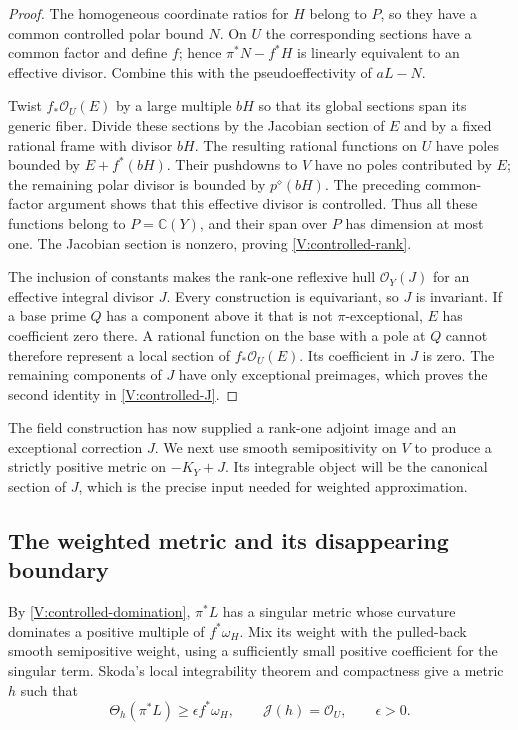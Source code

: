 \begin{proof}
The homogeneous coordinate ratios for $H$ belong to $P$, so they have
a common controlled polar bound $N$.  On $U$ the corresponding sections
have a common factor and define $f$; hence
$\pi^*N-f^*H$ is linearly equivalent to an effective divisor.
Combine this with the pseudoeffectivity of $aL-N$.

Twist $f_*\mathcal O_U(E)$ by a large multiple $bH$ so that its global
sections span its generic fiber.  Divide these sections by the Jacobian
section of $E$ and by a fixed rational frame with divisor $bH$.
The resulting rational functions on $U$ have poles bounded by
$E+f^*(bH)$.  Their pushdowns to $V$ have no poles contributed by $E$;
the remaining polar divisor is bounded by $p^\diamond(bH)$.
The preceding common-factor argument shows that this effective divisor
is controlled.  Thus all these functions belong to $P=\mathbb C(Y)$,
and their span over $P$ has dimension at most one.  The Jacobian section
is nonzero, proving \eqref{V:controlled-rank}.

The inclusion of constants makes the rank-one reflexive hull
$\mathcal O_Y(J)$ for an effective integral divisor $J$.  Every
construction is equivariant, so $J$ is invariant.  If a base prime $Q$
has a component above it that is not $\pi$-exceptional, $E$ has
coefficient zero there.  A rational function on the base with a pole at
$Q$ cannot therefore represent a local section of
$f_*\mathcal O_U(E)$.  Its coefficient in $J$ is zero.  The remaining
components of $J$ have only exceptional preimages, which proves the
second identity in \eqref{V:controlled-J}.
\end{proof}

The field construction has now supplied a rank-one adjoint image and
an exceptional correction $J$.  We next use smooth semipositivity on
$V$ to produce a strictly positive metric on $-K_Y+J$.  Its integrable
object will be the canonical section of $J$, which is the precise input
needed for weighted approximation.

\subsection{The weighted metric and its disappearing boundary}

By \eqref{V:controlled-domination}, $\pi^*L$ has a singular metric
whose curvature dominates a positive multiple of $f^*\omega_H$.
Mix its weight with the pulled-back smooth semipositive weight, using a
sufficiently small positive coefficient for the singular term.
Skoda's local integrability theorem \cite{Skoda1972} and compactness
give a metric $h$
such that
\begin{equation}\label{V:controlled-upstairs-metric}
 \Theta_h(\pi^*L)\ge\epsilon f^*\omega_H,
 \qquad \mathcal J(h)=\mathcal O_U,
 \qquad \epsilon>0.
\end{equation}

